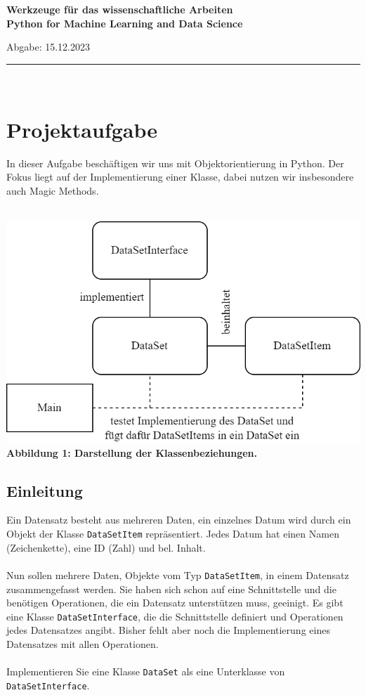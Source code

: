 \documentclass[a4paper]{article}
\begin{document}
\bf
\Large\noindent  Werkzeuge für das wissenschaftliche Arbeiten\\
\normalsize Python for Machine Learning and Data Science\\
\normalfont
\begin{center}
    \normalfont Abgabe: 15.12.2023\\
\end{center}
\hrule\hfill\\[0.2cm]

\tableofcontents

\section{Projektaufgabe}
In dieser Aufgabe beschäftigen wir uns mit Objektorientierung in Python.
Der Fokus liegt auf der Implementierung einer Klasse, dabei nutzen wir insbesondere auch Magic Methods.\\
\\
\begin{center}
    \includegraphics[scale=0.45]{./../diagram/classes_files.png}\\
    \scriptsize\bf Abbildung 1: \normalfont Darstellung der Klassenbeziehungen.\normalsize\\
\end{center}

\subsection{Einleitung}
Ein Datensatz besteht aus mehreren Daten, ein einzelnes Datum wird durch ein Objekt der Klasse \verb|DataSetItem| repräsentiert.
Jedes Datum hat einen Namen (Zeichenkette), eine ID (Zahl) und bel. Inhalt.\\
\\
Nun sollen mehrere Daten, Objekte vom Typ \verb|DataSetItem|, in einem Datensatz zusammengefasst werden.
Sie haben sich schon auf eine Schnittstelle und die benötigen Operationen, die ein Datensatz unterstützen muss, geeinigt.
Es gibt eine Klasse \verb|DataSetInterface|, die die Schnittstelle definiert und Operationen jedes Datensatzes angibt.
Bisher fehlt aber noch die Implementierung eines Datensatzes mit allen Operationen.\\
\\
Implementieren Sie eine Klasse \verb|DataSet| als eine Unterklasse von  \verb|DataSetInterface|.\\
\\
\end{document}
